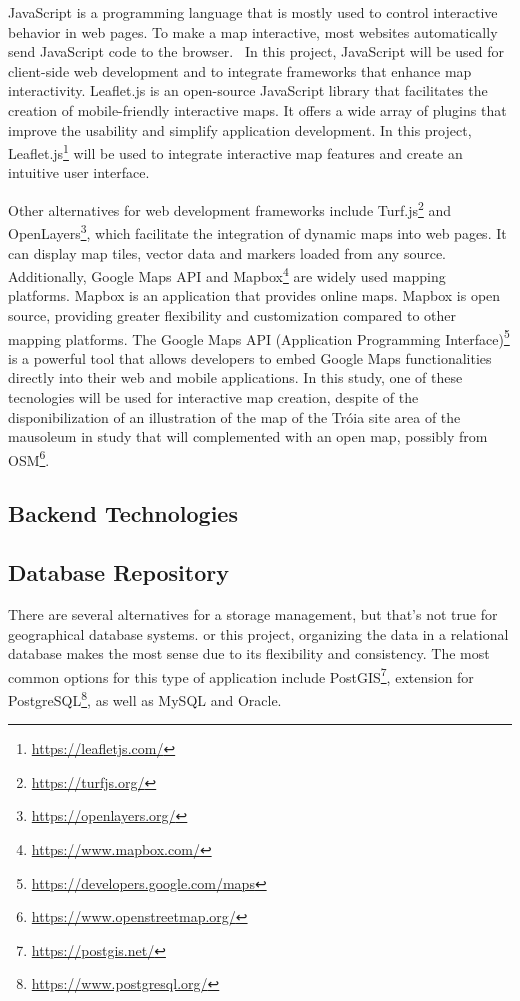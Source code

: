 JavaScript is a programming language that is mostly used to control interactive behavior in web
pages. To make a map interactive, most websites automatically send JavaScript code to the browser.~\cite{ajayi2024utilizing} In this project, JavaScript will be used for client-side web development and to integrate frameworks that enhance map interactivity.
Leaflet.js is an open-source JavaScript library that facilitates the creation of mobile-friendly interactive maps. It offers a wide array of plugins that improve the usability and simplify application development.
In this project, Leaflet.js\footnote{\url{https://leafletjs.com/}} will be used to integrate interactive map features and create an intuitive user interface.

Other alternatives for web development frameworks include Turf.js\footnote{\url{https://turfjs.org/}} and OpenLayers\footnote{\url{https://openlayers.org/}}, which facilitate the integration of dynamic maps into web pages. It can display map tiles, vector data and markers loaded from any source.
Additionally, Google Maps API and Mapbox\footnote{\url{https://www.mapbox.com/}} are widely used mapping platforms. Mapbox is an application that provides online maps. Mapbox is open source, providing greater flexibility and customization compared to other mapping platforms. The Google Maps API (Application Programming Interface)\footnote{\url{https://developers.google.com/maps}} is a powerful tool that allows developers to embed Google Maps functionalities directly into their web and mobile applications. 
In this study, one of these tecnologies will be used for interactive map creation, despite of the disponibilization of an illustration of the map of the Tróia site area of the mausoleum in study that will complemented with an open map, possibly from \gls{OSM}\footnote{\url{https://www.openstreetmap.org/}}.

\subsection{Backend Technologies}
\label{sec:backend} 


\subsection{Database Repository}
\label{sec:repos}

There are several alternatives for a storage management, but that's not true for geographical database systems.
or this project, organizing the data in a relational database makes the most sense due to its flexibility and consistency.
The most common options for this type of application include PostGIS\footnote{\url{https://postgis.net/}}, extension for PostgreSQL\footnote{\url{https://www.postgresql.org/}}, as well as MySQL and Oracle.

